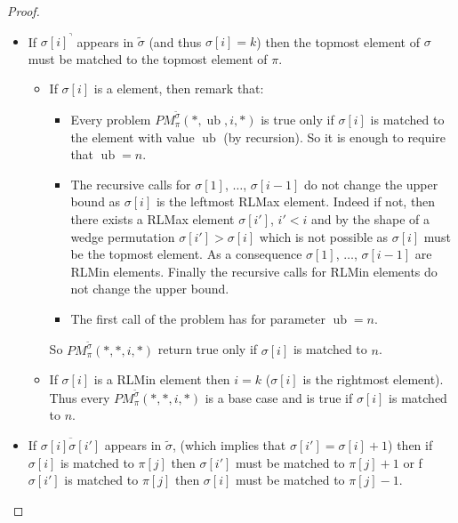 \documentclass[a4paper]{llncs}
\newcommand{\RLMax}{\text{RLMax}\xspace}
\newcommand{\ptext}{\pi}
\newcommand{\ppattern}{\sigma}
\newcommand{\PM}{PM}
\DeclareMathOperator{\ub}{ub}
\begin{document}
\begin{proof}
\begin{itemize}
\begin{itemize}
	\end{itemize}




	\item If ${\ppattern[i]}^\urcorner$ appears in $\widetilde{\sigma}$ (and thus $\sigma[i]=k$) then the topmost element of $\ppattern$ must be matched to the topmost element of $\ptext$.
	\begin{itemize}

		\item If $\sigma[i]$ is a \RLMax element, then remark that:
		\begin{itemize}
			\item Every problem
			$\PM^{\widetilde{\sigma}}_{\ptext}(*,\ub,i,*)$ is true only if $\sigma[i]$ is matched to the element with value $\ub$ (by recursion).
			So it is enough to require that $\ub=n$.
			\item The recursive calls for $\sigma[1]$, $\ldots$, $\sigma[i-1]$
			do not change the upper bound as
			$\sigma[i]$ is the leftmost RLMax element. Indeed if not, then there exists a RLMax element $\sigma[i']$, $i'<i$ and by the shape of a wedge permutation $\sigma[i']>\sigma[i]$ which is not possible as $\sigma[i]$ must be the topmost element.
			As a consequence $\sigma[1]$, $\ldots$, $\sigma[i-1]$ are RLMin elements. Finally the recursive calls for RLMin elements do not change the upper bound.
			\item The first call of the problem has for parameter $\ub=n$.
		\end{itemize}
		So $\PM^{\widetilde{\sigma}}_{\ptext}(*,*,i,*)$ return true only if
		$\sigma[i]$ is matched to $n$.

		\item If $\sigma[i]$ is a RLMin element then $i=k$ ($\sigma[i]$ is the rightmost element). Thus every $\PM^{\widetilde{\sigma}}_{\ptext}(*,*,i,*)$ is a base case and is true if $\sigma[i]$ is matched to $n$.

	\end{itemize}



	\item  If $\overline{\ppattern[i]\ppattern[i']}$ appears in $\widetilde{\sigma}$,  (which implies that $\ppattern[i']=\ppattern[i]+1$) then if $\ppattern[i]$ is matched to $\ptext[j]$ then $\ppattern[i']$ must be matched to $\ptext[j]+1$
	or f $\ppattern[i']$ is matched to $\ptext[j]$ then $\ppattern[i]$ must be matched to $\ptext[j]-1$.

		\begin{itemize}


\end{itemize}
\end{itemize}
\end{proof}
\end{document}
